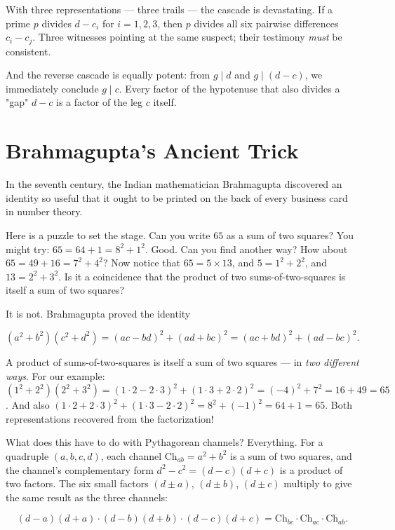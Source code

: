 \documentclass[11pt,twoside,openright]{book}
\theoremstyle{definition}
\theoremstyle{remark}
\begin{document}
With three representations --- three trails --- the cascade is devastating. If a prime $p$ divides $d - c_i$ for $i = 1, 2, 3$, then $p$ divides all six pairwise differences $c_i - c_j$. Three witnesses pointing at the same suspect; their testimony \textit{must} be consistent.

And the reverse cascade is equally potent: from $g \mid d$ and $g \mid (d - c)$, we immediately conclude $g \mid c$. Every factor of the hypotenuse that also divides a "gap" $d - c$ is a factor of the leg $c$ itself.



\section{Brahmagupta's Ancient Trick}

In the seventh century, the Indian mathematician Brahmagupta discovered an identity so useful that it ought to be printed on the back of every business card in number theory.

Here is a puzzle to set the stage. Can you write $65$ as a sum of two squares? You might try: $65 = 64 + 1 = 8^2 + 1^2$. Good. Can you find another way? How about $65 = 49 + 16 = 7^2 + 4^2$? Now notice that $65 = 5 \times 13$, and $5 = 1^2 + 2^2$, and $13 = 2^2 + 3^2$. Is it a coincidence that the product of two sums-of-two-squares is itself a sum of two squares?

It is not. Brahmagupta proved the identity

\[(a^2 + b^2)(c^2 + d^2) = (ac - bd)^2 + (ad + bc)^2 = (ac + bd)^2 + (ad - bc)^2.\]

A product of sums-of-two-squares is itself a sum of two squares --- in \textit{two different ways}. For our example: $(1^2 + 2^2)(2^2 + 3^2) = (1 \cdot 2 - 2 \cdot 3)^2 + (1 \cdot 3 + 2 \cdot 2)^2 = (-4)^2 + 7^2 = 16 + 49 = 65$. And also $(1 \cdot 2 + 2 \cdot 3)^2 + (1 \cdot 3 - 2 \cdot 2)^2 = 8^2 + (-1)^2 = 64 + 1 = 65$. Both representations recovered from the factorization!

What does this have to do with Pythagorean channels? Everything. For a quadruple $(a, b, c, d)$, each channel $\mathrm{Ch}_{ab} = a^2 + b^2$ is a sum of two squares, and the channel's complementary form $d^2 - c^2 = (d-c)(d+c)$ is a product of two factors. The six small factors $(d \pm a)$, $(d \pm b)$, $(d \pm c)$ multiply to give the same result as the three channels:

\[(d-a)(d+a) \cdot (d-b)(d+b) \cdot (d-c)(d+c) = \mathrm{Ch}_{bc} \cdot \mathrm{Ch}_{ac} \cdot \mathrm{Ch}_{ab}.\]
\end{document}
